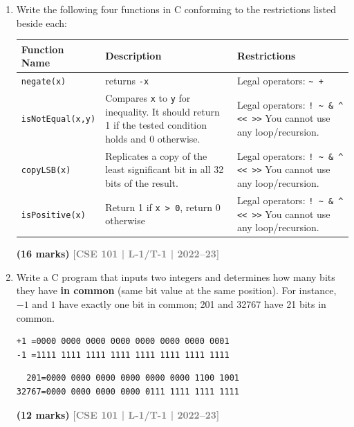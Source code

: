 \documentclass[12pt,a3paper]{article}
\newcommand{\yr}[1]{\hfill\textcolor{gray}{\small\textbf{[#1]}}}
\newcommand{\mk}[1]{\textcolor{orange!70!black}{\small\textbf{(#1 marks)}}}
\begin{document}
\begin{enumerate}
\item Write the following four functions in C conforming to the restrictions listed beside each:
\begin{center}
  \renewcommand{\arraystretch}{1.4} 
\begin{tabularx}{\textwidth}{|l|X|X|}
\hline
\textbf{Function Name} & \textbf{Description} & \textbf{Restrictions} \\ \hline
\texttt{negate(x)} & returns \texttt{-x} & Legal operators: \texttt{\textasciitilde{} +} \\ \hline
\texttt{isNotEqual(x,y)} & Compares \texttt{x} to \texttt{y} for inequality. It should return 1 if the tested condition holds and 0 otherwise. & Legal operators: \texttt{! \textasciitilde{} \& \textasciicircum{} \textbar{} << >>} \newline You cannot use any loop/recursion. \\ \hline
\texttt{copyLSB(x)} & Replicates a copy of the least significant bit in all 32 bits of the result. & Legal operators: \texttt{! \textasciitilde{} \& \textasciicircum{} \textbar{} << >>} \newline You cannot use any loop/recursion. \\ \hline
\texttt{isPositive(x)} & Return 1 if \texttt{x > 0}, return 0 otherwise & Legal operators: \texttt{! \textasciitilde{} \& \textasciicircum{} \textbar{} << >>} \newline You cannot use any loop/recursion. \\ \hline
\end{tabularx}
\end{center}
\mk{16} \yr{CSE 101 | L-1/T-1 | 2022--23}

\item Write a C program that inputs two integers and determines how many bits they have \textbf{in common} (same bit value at the same position). For instance, $-1$ and $1$ have exactly one bit in common; 201 and 32767 have 21 bits in common.

\begin{lstlisting}
+1 =0000 0000 0000 0000 0000 0000 0000 0001
-1 =1111 1111 1111 1111 1111 1111 1111 1111
\end{lstlisting}
\begin{lstlisting}
  201=0000 0000 0000 0000 0000 0000 1100 1001
32767=0000 0000 0000 0000 0111 1111 1111 1111
\end{lstlisting}

\mk{12} \yr{CSE 101 | L-1/T-1 | 2022--23}
    

\end{enumerate}
\end{document}
